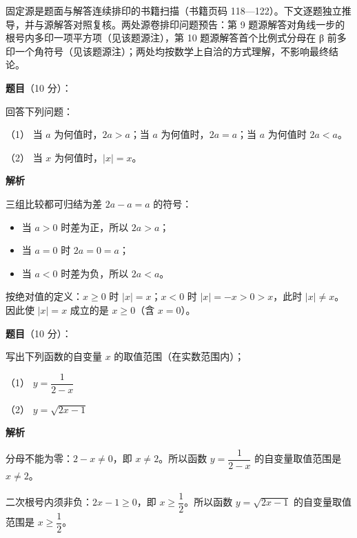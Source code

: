 

\begin{gktip}
固定源是题面与解答连续排印的书籍扫描（书籍页码 118—122）。下文逐题独立推导，并与源解答对照复核。两处源卷排印问题预告：第 9 题源解答对角线一步的根号内多印一项平方项（见该题源注），第 10 题源解答首个比例式分母在 β 前多印一个角符号（见该题源注）；两处均按数学上自洽的方式理解，不影响最终结论。
\end{gktip}

\begin{answer}

\textbf{题目}（10 分）：

回答下列问题：

（1） 当 $a$ 为何值时，$2a>a$；当 $a$ 为何值时，$2a=a$；当 $a$ 为何值时 $2a<a$。

（2） 当 $x$ 为何值时，$|x|=x$。

\textbf{解析}


三组比较都可归结为差 $2a-a=a$ 的符号：

\begin{itemize}
\item 当 $a>0$ 时差为正，所以 $2a>a$；
\item 当 $a=0$ 时 $2a=0=a$；
\item 当 $a<0$ 时差为负，所以 $2a<a$。
\end{itemize}


按绝对值的定义：$x\ge 0$ 时 $|x|=x$；$x<0$ 时 $|x|=-x>0>x$，此时 $|x|\ne x$。因此使 $|x|=x$ 成立的是 $x\ge 0$（含 $x=0$）。



\end{answer}
\begin{answer}

\textbf{题目}（10 分）：

写出下列函数的自变量 $x$ 的取值范围（在实数范围内）；

（1） $y=\dfrac{1}{2-x}$

（2） $y=\sqrt{2x-1}$

\textbf{解析}


分母不能为零：$2-x\ne 0$，即 $x\ne 2$。所以函数 $y=\dfrac{1}{2-x}$ 的自变量取值范围是 $x\ne 2$。


二次根号内须非负：$2x-1\ge 0$，即 $x\ge\dfrac{1}{2}$。所以函数 $y=\sqrt{2x-1}$ 的自变量取值范围是 $x\ge\dfrac{1}{2}$。



\end{answer}
